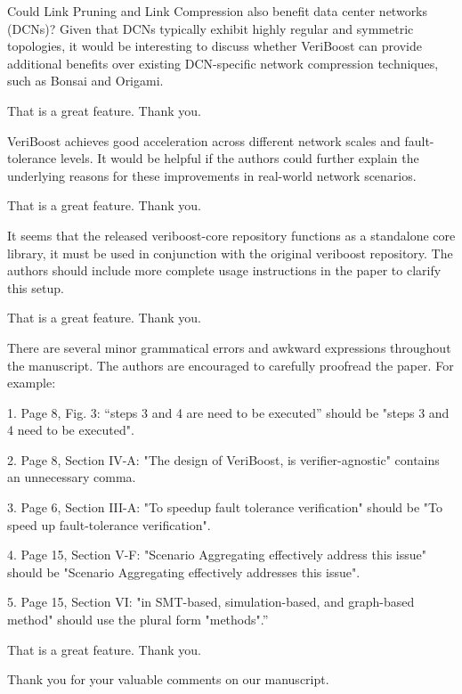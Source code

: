\begin{revcomment}[breakable]
Could Link Pruning and Link Compression also benefit data center networks (DCNs)? 
Given that DCNs typically exhibit highly regular and symmetric topologies, 
it would be interesting to discuss whether VeriBoost can provide additional benefits over existing DCN-specific network compression techniques, 
such as Bonsai and Origami.
\end{revcomment}
\begin{revresponse}
	That is a great feature. Thank you.
\end{revresponse}

\begin{revcomment}[breakable]
VeriBoost achieves good acceleration across different network scales and fault-tolerance levels. 
It would be helpful if the authors could further explain the underlying reasons for these improvements in real-world network scenarios.
\end{revcomment}
\begin{revresponse}
	That is a great feature. Thank you.
\end{revresponse}

\begin{revcomment}[breakable]
It seems that the released veriboost-core repository functions as a standalone core library, 
it must be used in conjunction with the original veriboost repository. 
The authors should include more complete usage instructions in the paper to clarify this setup.
\end{revcomment}
\begin{revresponse}
	That is a great feature. Thank you.
\end{revresponse}

\begin{revcomment}[parbox=true,after upper={}]
There are several minor grammatical errors and awkward expressions throughout the manuscript. The authors are encouraged to carefully proofread the paper. For example:

1. Page 8, Fig. 3: ``steps 3 and 4 are need to be executed” should be "steps 3 and 4 need to be executed".

2. Page 8, Section IV-A: "The design of VeriBoost, is verifier-agnostic" contains an unnecessary comma.

3. Page 6, Section III-A: "To speedup fault tolerance verification" should be "To speed up fault-tolerance verification".

4. Page 15, Section V-F: "Scenario Aggregating effectively address this issue" should be "Scenario Aggregating effectively addresses this issue".

5. Page 15, Section VI: "in SMT-based, simulation-based, and graph-based method" should use the plural form "methods".\textquotedblright
\end{revcomment}
\begin{revresponse}
	That is a great feature. Thank you.
\end{revresponse}

\begin{concludingresponse}[]
	Thank you for your valuable comments on our manuscript.
\end{concludingresponse}
